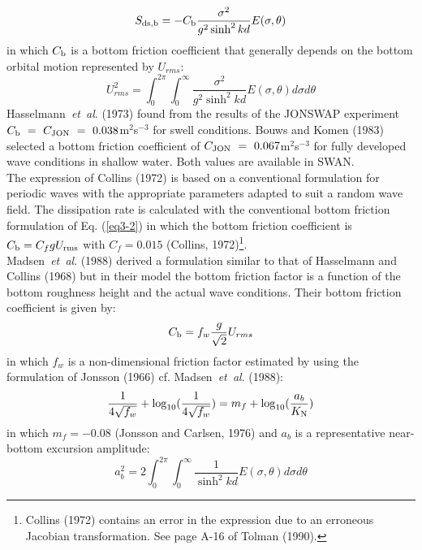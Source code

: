 \documentclass[12pt]{book}
\begin{document}
\begin{equation}
  S_{\rm ds,b} = -C_{\rm b} \frac{\sigma^2}{g^2 \sinh^2 kd} E (\sigma,\theta)
  \label{eq3-17}
\end{equation}
in which $C_{\rm b}$ is a bottom friction coefficient that generally depends on the bottom orbital motion
represented by $U_{rms}$:
\begin{equation}
  U^2_{rms} = \int_{0}^{2\pi} \int_{0}^{\infty} \frac{\sigma^2}{g^2 \sinh^2 kd} E(\sigma,\theta) d\sigma d\theta
  \label{eq3-18}
\end{equation}
Hasselmann~{\it et~al}. (1973) found from the results of the JONSWAP experiment
$C_{\rm b}~=~C_{\rm JON}~=~0.038$m$^{2}$s$^{-3}$ for swell conditions. Bouws and Komen (1983) selected a bottom
friction coefficient of $C_{\rm JON}~=~0.067$m$^{2}$s$^{-3}$ for
fully developed wave conditions in shallow water. Both values are available in SWAN.
\\[2ex]
\noindent
The expression of Collins (1972) is based on a conventional formulation for periodic waves with the
appropriate parameters adapted to suit a random wave field. The dissipation rate is calculated with the
conventional bottom friction formulation of Eq. (\ref{eq3-2}) in which the bottom friction coefficient is
$C_{\rm b} = C_f g U_{\rm rms}$ with $C_f = 0.015$ (Collins, 1972)\footnote{Collins (1972) contains
an error in the expression due to an erroneous Jacobian transformation. See page A-16 of Tolman (1990).}.
\\[2ex]
\noindent
Madsen~{\it et~al}. (1988) derived a formulation similar to that of Hasselmann and Collins (1968) but in their
model the bottom friction factor is a function of the bottom roughness height and the actual wave
conditions. Their bottom friction coefficient is given by:
\begin{equation}
  C_{\rm b} = f_w \frac{g}{\sqrt{2}} U_{rms}
  \label{eq3-19}
\end{equation}
in which $f_w$ is a non-dimensional friction factor estimated by using the formulation of Jonsson (1966) cf.
Madsen~{\it et~al}. (1988):
\begin{equation}
  \frac{1}{4\sqrt{f_w}} + \log_{10} (\frac{1}{4\sqrt{f_w}}) = m_f + \log_{10} (\frac{a_b}{K_{\rm N}})
  \label{eq3-20}
\end{equation}
in which $m_f = -0.08$ (Jonsson and Carlsen, 1976) and $a_b$ is a representative near-bottom excursion
amplitude:
\begin{equation}
  a^2_{b} = 2\int_{0}^{2\pi} \int_{0}^{\infty} \frac{1}{\sinh^2 kd} E(\sigma,\theta) d\sigma d\theta
  \label{eq3-21}
\end{equation}
\end{document}
